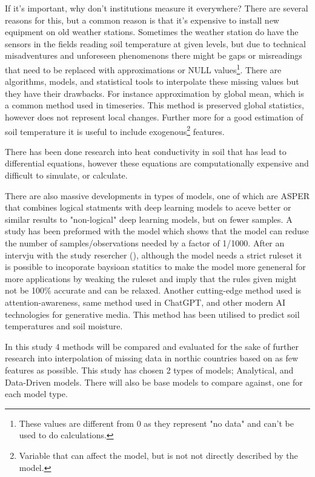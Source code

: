 If it's important, why don't institutions measure it everywhere? There are several reasons for this, but a common reason is that it's expensive to install new equipment on old weather stations. Sometimes the weather station do have the sensors in the fields reading soil temperature at given levels, but due to technical misadventures and unforeseen phenomenons there might be gaps or misreadings that need to be replaced with approximations or NULL values\footnote{These values are different from 0 as they represent "no data" and can't be used to do calculations.}. There are algorithms, models, and statistical tools to interpolate these missing values but they have their drawbacks. For instance approximation by global mean, which is a common method used in timeseries\cite{lepot_interpolation_2017}. This method is preserved global statistics, however does not represent local changes. Further more for a good estimation of soil temperature it is useful to include exogenous\footnote{Variable that can affect the model, but is not not directly described by the model.} features.

There has been done research into heat conductivity in soil that has lead to differential equations\cite{karvonen_model_1988}, however these equations\cite{fourier_analytical_2009,karvonen_model_1988} are computationally expensive and difficult to simulate, or calculate\cite{rankinen_simple_2004}. 

There are also massive developments in types of models, one of which are ASPER\cite{le_asper_2023} that combines logical statments with deep learning models to aceve better or similar results to "non-logical" deep learning models, but on fewer samples. A study has been preformed with the model which shows that the model can reduse the number of samples/observations needed by a factor of 1/1000\cite{machot_bridging_2023}. After an intervju with the study resercher (\citeauthor{machot_bridging_2023}), although the model needs a strict ruleset it is possible to incoporate baysioan statitics to make the model more geneneral for more applications by weaking the ruleset and imply that the rules given might not be 100\% accurate and can be relaxed. Another cutting-edge method used is attention-awareness, same method used in ChatGPT, and other modern AI technologies for generative media. This method has been utilised to predict soil temperatures and soil moisture\cite{li_attention-aware_2022}.

In this study 4 methods will be compared and evaluated for the sake of further research into interpolation of missing data in northic countries based on as few features as possible. This study has chosen 2 types of models; Analytical, and Data-Driven models. There will also be base models to compare against, one for each model type. 